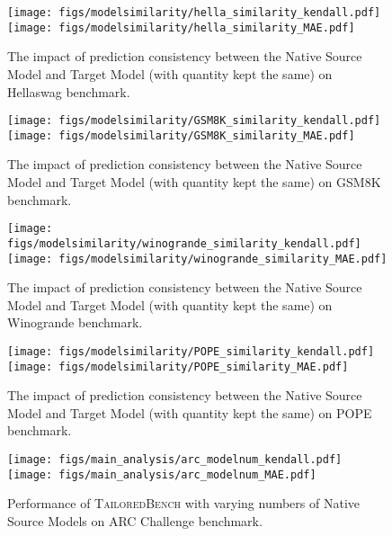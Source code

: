 \begin{figure*}[ht]
  \texttt{[image: figs/modelsimilarity/hella\_similarity\_kendall.pdf]} \hfill
  \texttt{[image: figs/modelsimilarity/hella\_similarity\_MAE.pdf]}
  \caption {The impact of prediction consistency between the Native Source Model and Target Model (with quantity kept the same) on Hellaswag benchmark.}
\vspace{-0.3cm}
\label{Similarity_hella}
\end{figure*}

\begin{figure*}[ht]
  \texttt{[image: figs/modelsimilarity/GSM8K\_similarity\_kendall.pdf]} \hfill
  \texttt{[image: figs/modelsimilarity/GSM8K\_similarity\_MAE.pdf]}
  \caption {The impact of prediction consistency between the Native Source Model and Target Model (with quantity kept the same) on GSM8K benchmark.}
\vspace{-0.3cm}
\label{Similarity_GSM8K}
\end{figure*}

\begin{figure*}[ht]
  \texttt{[image: figs/modelsimilarity/winogrande\_similarity\_kendall.pdf]} \hfill
  \texttt{[image: figs/modelsimilarity/winogrande\_similarity\_MAE.pdf]}
  \caption {The impact of prediction consistency between the Native Source Model and Target Model (with quantity kept the same) on Winogrande benchmark.}
\vspace{-0.3cm}
\label{Similarity_winogrande}
\end{figure*}

\begin{figure*}[ht]
  \texttt{[image: figs/modelsimilarity/POPE\_similarity\_kendall.pdf]} \hfill
  \texttt{[image: figs/modelsimilarity/POPE\_similarity\_MAE.pdf]}
  \caption {The impact of prediction consistency between the Native Source Model and Target Model (with quantity kept the same) on POPE benchmark.}
\vspace{-0.3cm}
\label{Similarity_pope}
\end{figure*}

\begin{figure*}[htbp]
  \texttt{[image: figs/main\_analysis/arc\_modelnum\_kendall.pdf]} \hfill
  \texttt{[image: figs/main\_analysis/arc\_modelnum\_MAE.pdf]}
  \caption {Performance of \textsc{TailoredBench} with varying numbers of Native Source Models on ARC Challenge benchmark.}
\vspace{-0.3cm}
\label{mainanalysis_arc}
\end{figure*}

